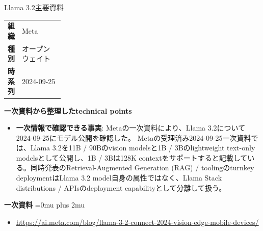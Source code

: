 \begin{technicalnote}{Llama 3.2}{主要資料}
\begingroup
\begin{tabularx}{\linewidth}{@{}>{\bfseries}p{0.22\linewidth}X@{}}
組織 & Meta \\
種別 & オープンウェイト \\
時系列 & 2024-09-25 \\
\end{tabularx}
\smallskip
{\bfseries 一次資料から整理したtechnical points}
\begin{itemize}[leftmargin=1.5em,itemsep=0.35em]
\item \textbf{一次情報で確認できる事実}: Metaの一次資料により、Llama 3.2について2024-09-25にモデル公開を確認した。 Metaの受理済み2024-09-25一次資料では、Llama 3.2を11B / 90Bのvision modelsと1B / 3Bのlightweight text-only modelsとして公開し、1B / 3Bは128K contextをサポートすると記載している。同時発表のRetrieval-Augmented Generation (RAG) / toolingのturnkey deploymentはLlama 3.2 model自身の属性ではなく、Llama Stack distributions / APIsのdeployment capabilityとして分離して扱う。
\end{itemize}
\begin{minipage}{\linewidth}
\begin{samepage}
{\bfseries 一次資料}
\begingroup\sloppy
\Urlmuskip=0mu plus 2mu\relax
\begin{itemize}[leftmargin=1.5em,itemsep=0.25em]
\item {\scriptsize\url{https://ai.meta.com/blog/llama-3-2-connect-2024-vision-edge-mobile-devices/}}
\end{itemize}
\endgroup
\end{samepage}
\end{minipage}
\endgroup
\end{technicalnote}
\medskip

